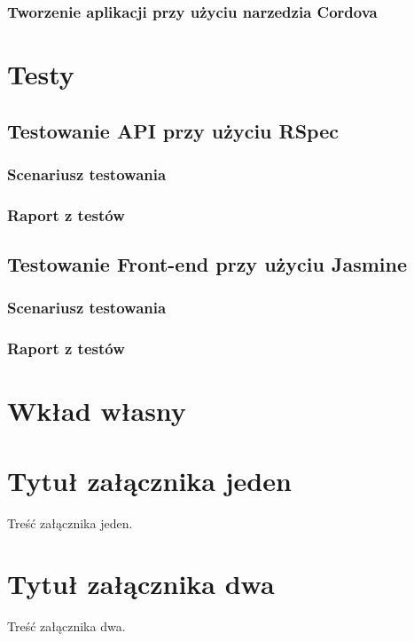 \documentclass[brudnopis]{xmgr}
\begin{document}
\subsection{Tworzenie aplikacji przy użyciu narzedzia Cordova}

\chapter{Testy}
\section{Testowanie API przy użyciu RSpec}
\subsection{Scenariusz testowania}
\subsection{Raport z testów}
\section{Testowanie Front-end przy użyciu Jasmine}
\subsection{Scenariusz testowania}
\subsection{Raport z testów}
\chapter{Wkład własny}
\summary

\appendix
\chapter{Tytuł załącznika jeden}

Treść załącznika jeden.
\chapter{Tytuł załącznika dwa}

Treść załącznika dwa.




\nocite {magiaUI}
\nocite {design}
\nocite {projektowanieUI}
\nocite {StiveKrug}
\nocite{DouglasCrockford}
\nocite {UIRails}
\nocite {modelingUI}
\nocite {rspecDoc}
\nocite {railsDoc}
\nocite {emberDoc}
\nocite{emberCLIDoc}
\nocite{emberRails}
\nocite{emberTutorial}
\nocite{emberIntro}

\listoftables

\listoffigures

\oswiadczenie
\end{document}
